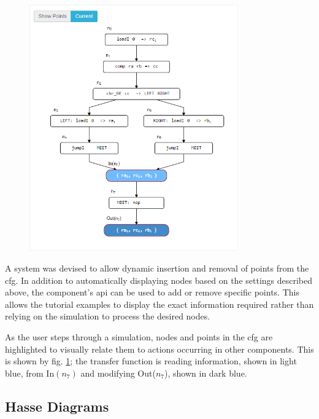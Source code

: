 \documentclass[bsc,twoside,singlespacing,parskip,logo,notimes,normalheadings]{infthesis}
\begin{document}
        \begin{figure}
            \includegraphics[width=9cm]{img/cfg-vis.png}
            \label{fig:cfg-vis}
        \end{figure}

        A system was devised to allow dynamic insertion and removal of
        points from the \gls{cfg}. In addition to automatically
        displaying nodes based on the settings described above, the
        component's \gls{api} can be used to add or remove specific
        points. This allows the tutorial examples to display the exact
        information required rather than relying on the simulation to
        process the desired nodes.

        As the user steps through a simulation, nodes and points in
        the \gls{cfg} are highlighted to visually relate them to
        actions occurring in other components. This is shown by
        fig. \ref{fig:cfg-vis}; the transfer function is reading
        information, shown in light blue, from In$(n_7)$ and modifying
        Out($n_7$), shown in dark blue.

        \subsection{Hasse Diagrams}
\end{document}
